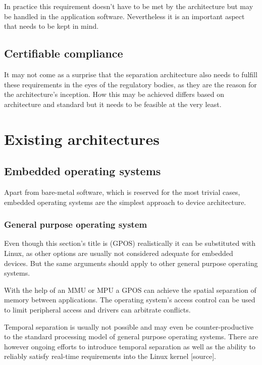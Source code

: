 In practice this requirement doesn't have to be met by the architecture but may be handled in the application software. Nevertheless it is an important aspect that needs to be kept in mind.
\subsection{Certifiable compliance}
It may not come as a surprise that the separation architecture also needs to fulfill these requirements in the eyes of the regulatory bodies, as they are the reason for the architecture's inception.
How this may be achieved differs based on architecture and standard but it needs to be feasible at the very least.


\section{Existing architectures}
\subsection{Embedded operating systems}
Apart from bare-metal software, which is reserved for the most trivial cases,  embedded operating systems are the simplest approach to device architecture. 
\subsubsection{General purpose operating system}
Even though this section's title is  (GPOS) realistically it can be substituted with Linux, as other options are usually not considered adequate for embedded devices. But the same arguments should apply to other general purpose operating systems.

With the help of an \gls{MMU} or \gls{MPU}  a \gls{GPOS} can achieve the spatial separation of memory between applications. The operating system's access control can be used to limit peripheral access and drivers can arbitrate conflicts. 

Temporal separation is usually not possible and may even be counter-productive to the standard processing model of general purpose operating systems. There are however ongoing efforts to introduce temporal separation as well as the ability to reliably satisfy real-time requirements into the Linux kernel [source]. 

